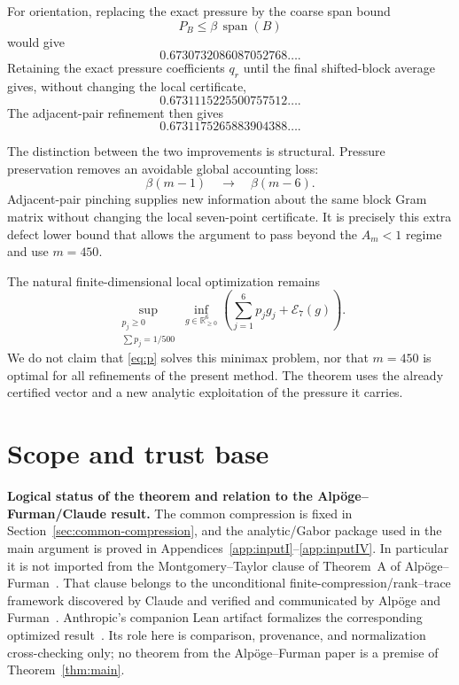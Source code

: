 \documentclass[11pt]{article}
\newcommand{\R}{\mathbb R}
\begin{document}
For orientation, replacing the exact pressure by the coarse span bound
\[
 P_B\le\beta\,\operatorname{span}(B)
\]
would give
\[
 0.6730732086087052768\ldots .
\]
Retaining the exact pressure coefficients \(q_r\) until the final
shifted-block average gives, without changing the local certificate,
\[
 0.6731115225500757512\ldots .
\]
The adjacent-pair refinement then gives
\[
 \boxed{0.6731175265883904388\ldots}.
\]

The distinction between the two improvements is structural.  Pressure
preservation removes an avoidable global accounting loss:
\[
 \beta(m-1)\quad\longrightarrow\quad\beta(m-6).
\]
Adjacent-pair pinching supplies new information about the same block Gram
matrix without changing the local seven-point certificate.  It is precisely
this extra defect lower bound that allows the argument to pass beyond the
\(A_m<1\) regime and use \(m=450\).

The natural finite-dimensional local optimization remains
\begin{equation}\label{eq:minimax}
 \sup_{\substack{p_j\ge0\\\sum p_j=1/500}}
 \inf_{g\in\R_{\ge0}^6}
 \left(\sum_{j=1}^6p_jg_j+\mathcal E_7(g)\right).
\end{equation}
We do not claim that \eqref{eq:p} solves this minimax problem, nor that
\(m=450\) is optimal for all refinements of the present method.  The theorem
uses the already certified vector and a new analytic exploitation of the
pressure it carries.

\section{Scope and trust base}\label{sec:trust}

\noindent\textbf{Logical status of the theorem and relation to the
Alpöge--Furman/Claude result.}
The common compression is fixed in Section~\ref{sec:common-compression}, and
the analytic/Gabor package used in the main argument is proved in
Appendices~\ref{app:inputI}--\ref{app:inputIV}.  In particular it is not
imported from the Montgomery--Taylor clause of Theorem~A of Alpöge--Furman~\cite{AlpogeFurman26}.  That clause belongs to the unconditional finite-compression/rank--trace
framework discovered by Claude and verified and communicated by Alpöge and
Furman~\cite{AlpogeFurman26,Anthropic26}.  Anthropic's companion Lean
artifact formalizes the corresponding optimized result~\cite{AnthropicFormal26}.
Its role here is comparison, provenance, and normalization cross-checking
only; no theorem from the Alpöge--Furman paper is a premise of
Theorem~\ref{thm:main}.
\end{document}
